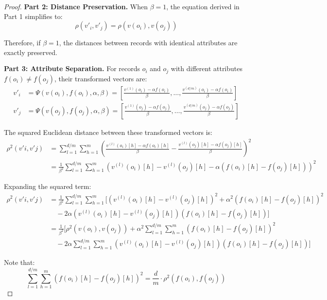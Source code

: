 \documentclass[10pt,a4paper]{amsart}
\begin{document}
\begin{proof}
\textbf{Part 2: Distance Preservation.}
When $\beta = 1$, the equation derived in Part 1 simplifies to:
\begin{equation}
\rho(v'_i, v'_j) = \rho(v(o_i), v(o_j))
\end{equation}

Therefore, if $\beta = 1$, the distances between records with identical attributes are exactly preserved.

\textbf{Part 3: Attribute Separation.}
For records $o_i$ and $o_j$ with different attributes $f(o_i) \neq f(o_j)$, their transformed vectors are:
\begin{align}
v'_i &= \Psi(v(o_i), f(o_i), \alpha, \beta) = \left[\frac{v^{(1)}(o_i) - \alpha f(o_i)}{\beta}, \ldots, \frac{v^{(d/m)}(o_i) - \alpha f(o_i)}{\beta}\right] \\
v'_j &= \Psi(v(o_j), f(o_j), \alpha, \beta) = \left[\frac{v^{(1)}(o_j) - \alpha f(o_j)}{\beta}, \ldots, \frac{v^{(d/m)}(o_j) - \alpha f(o_j)}{\beta}\right]
\end{align}

The squared Euclidean distance between these transformed vectors is:
\begin{align}
\rho^2(v'i, v'j) &= \sum_{l=1}^{d/m} \sum_{h=1}^{m} \left(\frac{v^{(l)}(o_i)[h] - \alpha f(o_i)[h]}{\beta} - \frac{v^{(l)}(o_j)[h] - \alpha f(o_j)[h]}{\beta}\right)^2 \\
&= \frac{1}{\beta^2}\sum_{l=1}^{d/m} \sum_{h=1}^{m} \left(v^{(l)}(o_i)[h] - v^{(l)}(o_j)[h] - \alpha(f(o_i)[h] - f(o_j)[h])\right)^2
\end{align}

Expanding the squared term:
\begin{align}
\rho^2(v'i, v'j) &= \frac{1}{\beta^2}\sum_{l=1}^{d/m} \sum_{h=1}^{m} \Big[ (v^{(l)}(o_i)[h] - v^{(l)}(o_j)[h])^2 + \alpha^2(f(o_i)[h] - f(o_j)[h])^2 \\
&\quad - 2\alpha(v^{(l)}(o_i)[h] - v^{(l)}(o_j)[h])(f(o_i)[h] - f(o_j)[h]) \Big] \\
&= \frac{1}{\beta^2}\Big[\rho^2(v(o_i), v(o_j)) + \alpha^2 \sum_{l=1}^{d/m} \sum_{h=1}^{m} (f(o_i)[h] - f(o_j)[h])^2 \\
&\quad - 2\alpha \sum_{l=1}^{d/m} \sum_{h=1}^{m} (v^{(l)}(o_i)[h] - v^{(l)}(o_j)[h])(f(o_i)[h] - f(o_j)[h])\Big]
\end{align}

Note that:
\begin{equation}
\sum_{l=1}^{d/m} \sum_{h=1}^{m} (f(o_i)[h] - f(o_j)[h])^2 = \frac{d}{m} \cdot \rho^2(f(o_i), f(o_j))
\end{equation}


\end{proof}
\end{document}
